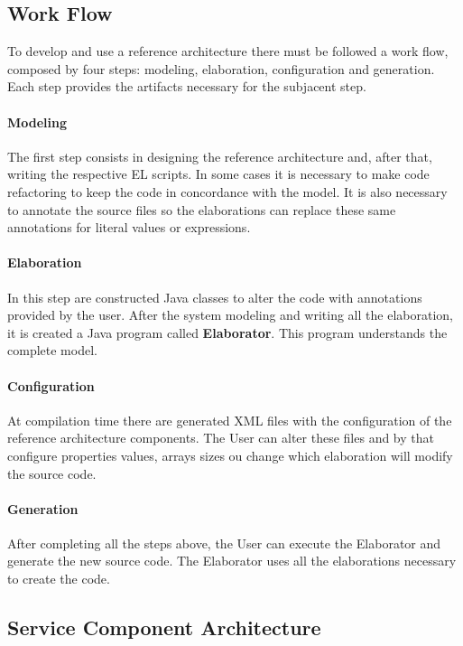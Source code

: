 \documentclass{report}
\begin{document}
		\subsection{Work Flow}
		
		\par To develop and use a reference architecture there must be followed a work flow, composed by four steps: modeling, elaboration, configuration and generation. Each step provides the artifacts necessary for the subjacent step.
		
			\paragraph{Modeling} The first step consists in designing the reference architecture and, after that, writing the respective EL scripts. In some cases it is necessary to make code refactoring to keep the code in concordance with the model. It is also necessary to annotate the source files so the elaborations can replace these same annotations for literal values or expressions.

			\paragraph{Elaboration} In this step are constructed Java classes to alter the code with annotations provided by the user. After the system modeling and writing all the elaboration, it is created a Java program called \textbf{Elaborator}. This program understands the complete model.

			\paragraph{Configuration} At compilation time there are generated XML files with the configuration of the reference architecture components. The User can alter these files and by that configure properties values, arrays sizes ou change which elaboration will modify the source code.

			\paragraph{Generation} After completing all the steps above, the User can execute the Elaborator and generate the new source code. The Elaborator uses all the elaborations necessary to create the code.

		\subsection{Service Component Architecture}
		\par 
\end{document}
